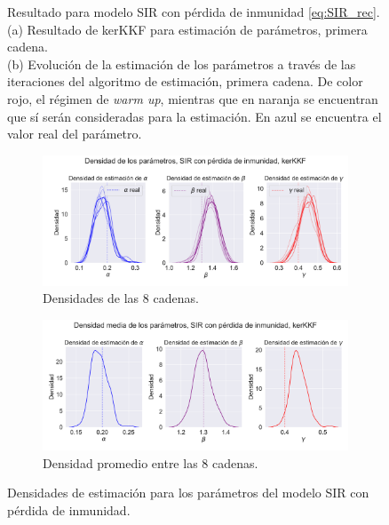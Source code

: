 \begin{figure}[h!]
\begin{subfigure}[b]{0.49\textwidth}
         \caption{}
         \label{fig:nonlinear_filters_sir_rec_params_evolution}
    \end{subfigure}
    \caption{Resultado para modelo SIR con pérdida de inmunidad \eqref{eq:SIR_rec}. \\
    (a) Resultado de kerKKF para estimación de parámetros, primera cadena. \\
    (b) Evolución de la estimación de los parámetros a través de las iteraciones del algoritmo de estimación, primera cadena. De color rojo, el régimen de \textit{warm up}, mientras que en naranja se encuentran que sí serán consideradas para la estimación. En azul se encuentra el valor real del parámetro.}
    \label{fig:SIR_inmun}
\end{figure}

\begin{figure}[h]
    \centering
    \begin{subfigure}[b]{0.8\textwidth}
        \centering \includegraphics[width=0.8\linewidth]{img/content/chapter4/nonlinear_filters_sir_rec_params_density.pdf}
    \caption{Densidades de las 8 cadenas.}
    \label{fig:nonlinear_filters_sir_rec_params_density}
    \end{subfigure}
    \begin{subfigure}[b]{0.8\textwidth}
        \centering \includegraphics[width=0.8\linewidth]{img/content/chapter4/nonlinear_filters_sir_rec_params_density_mean.pdf}
    \caption{Densidad promedio entre las 8 cadenas.}
    \label{fig:nonlinear_filters_sir_rec_params_density_mean}
    \end{subfigure}
    \caption{Densidades de estimación para los parámetros del modelo SIR con pérdida de inmunidad.}
\end{figure}

